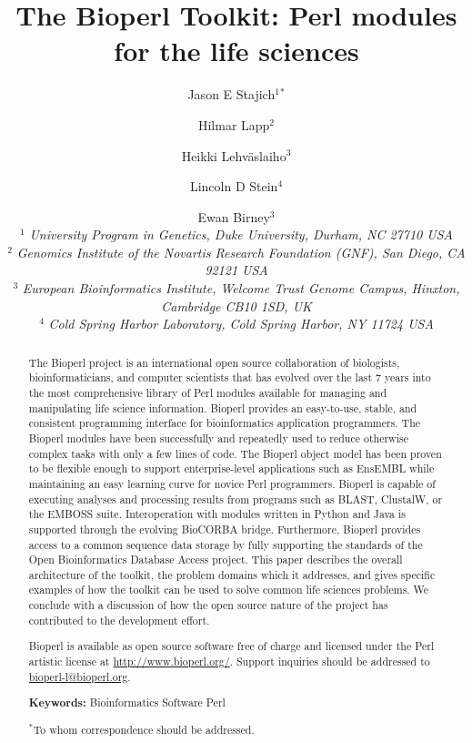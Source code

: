 \documentclass[12pt]{article}
\begin{document}
\doublespacing

\title{The Bioperl Toolkit: Perl modules for the life sciences}
\author{Jason E Stajich$^1$$^*$ \and Hilmar Lapp$^2$ \and Heikki Lehv\"{a}slaiho$^3$ \and Lincoln D Stein$^4$ \and Ewan Birney$^3$ \\
$^1$ \small{\textit{University Program in Genetics, Duke University,
Durham, NC 27710 USA}} \\
$^2$ \small{\textit{Genomics Institute of the Novartis Research
Foundation (GNF), San Diego, CA 92121 USA}} \\
$^3$ \small{\textit{European Bioinformatics Institute, Welcome Trust
Genome Campus, Hinxton, Cambridge CB10 1SD, UK}} \\
$^4$ \small{\textit{Cold Spring Harbor Laboratory, Cold Spring Harbor, NY 11724 USA}}\\
}
\maketitle
\begin{abstract}

The Bioperl project is an international open source collaboration of
biologists, bioinformaticians, and computer scientists that has
evolved over the last 7 years into the most comprehensive library of
Perl modules available for managing and manipulating life science
information.  Bioperl provides an easy-to-use, stable, and consistent
programming interface for bioinformatics application programmers.  The
Bioperl modules have been successfully and repeatedly used to reduce
otherwise complex tasks with only a few lines of code.  The Bioperl
object model has been proven to be flexible enough to support
enterprise-level applications such as EnsEMBL while maintaining an
easy learning curve for novice Perl programmers.  Bioperl is capable
of executing analyses and processing results from programs such as
BLAST, ClustalW, or the EMBOSS suite.  Interoperation with modules
written in Python and Java is supported through the evolving BioCORBA
bridge.  Furthermore, Bioperl provides access to a common sequence
data storage by fully supporting the standards of the Open
Bioinformatics Database Access project.  This paper describes the
overall architecture of the toolkit, the problem domains which it
addresses, and gives specific examples of how the toolkit can be used
to solve common life sciences problems.  We conclude with a discussion
of how the open source nature of the project has contributed to the
development effort.

Bioperl is available as open source software free of charge and
licensed under the Perl artistic license at \url{http://www.bioperl.org/}.  
Support inquiries should be addressed to \url{bioperl-l@bioperl.org}.

\textbf{Keywords:} Bioinformatics Software Perl

$^*$To whom correspondence should be addressed.

\end{abstract}
\end{document}
